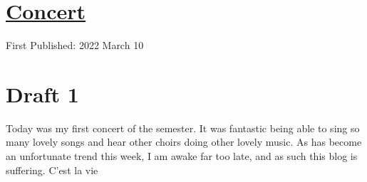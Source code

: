 \documentclass[12pt]{article}[titlepage]
\newcommand{\1}{\={a}}
\newcommand{\2}{\={e}}
\newcommand{\3}{\={\i}}
\newcommand{\4}{\=o}
\newcommand{\5}{\=u}
\newcommand{\6}{\={A}}
\renewcommand{\,}{\textsuperscript{,}}
\begin{document}
\doublespacing
\section{\href{spring-concert.html}{Concert}}
First Published: 2022 March 10


\section{Draft 1}
Today was my first concert of the semester.
It was fantastic being able to sing so many lovely songs and hear other choirs doing other lovely music.
As has become an unfortunate trend this week, I am awake far too late, and as such this blog is suffering.
C'est la vie
\end{document}
